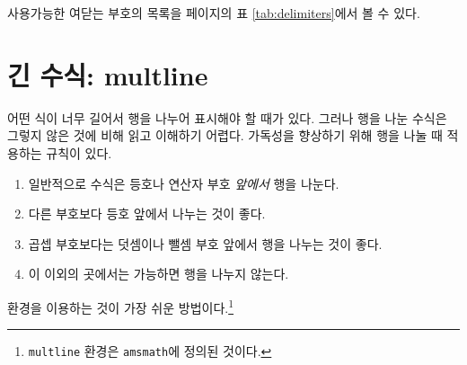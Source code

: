 사용가능한 여닫는 부호의 목록을 \pageref{tab:delimiters}페이지의 표 \ref{tab:delimiters}에서 볼 수 있다.

\section{긴 수식: multline}
\label{sec:multline}

어떤 식이 너무 길어서 행을 나누어
표시해야 할 때가 있다. 그러나 행을 나눈 수식은 그렇지 않은 것에 비해 
읽고 이해하기 어렵다. 가독성을 향상하기 위해 행을 나눌 때 적용하는 규칙이 있다.
\begin{enumerate} \firmlist
\item 일반적으로 수식은 등호나 연산자 부호 \emph{앞에서} 행을 나눈다.
\item 다른 부호보다 등호 앞에서 나누는 것이 좋다.
\item 곱셉 부호보다는 덧셈이나 뺄셈 부호 앞에서 행을 나누는 것이 좋다.
\item 이 이외의 곳에서는 가능하면 행을 나누지 않는다.
\end{enumerate}
 환경을 이용하는 것이 가장 쉬운 방법이다.\footnote{%
  \texttt{multline} 환경은 \texttt{amsmath}에 정의된 것이다.
}
